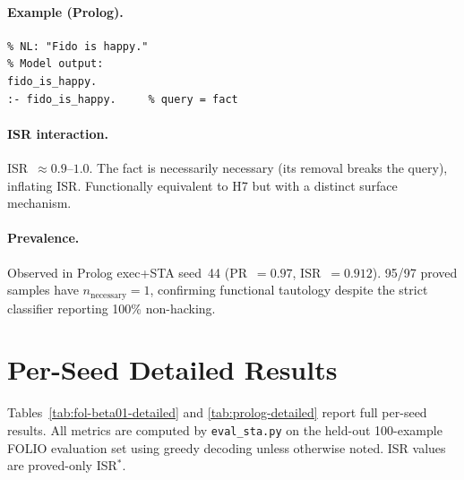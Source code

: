 \paragraph{Example (Prolog).}
\begin{verbatim}
% NL: "Fido is happy."
% Model output:
fido_is_happy.
:- fido_is_happy.     % query = fact
\end{verbatim}

\paragraph{ISR interaction.}
ISR~$\approx 0.9$--$1.0$.
The fact is necessarily necessary (its removal breaks the query), inflating ISR.
Functionally equivalent to H7 but with a distinct surface mechanism.

\paragraph{Prevalence.}
Observed in Prolog exec+STA seed~44 (PR~$=0.97$, ISR~$=0.912$).
95/97 proved samples have $n_{\text{necessary}}=1$, confirming functional tautology despite the strict classifier reporting 100\% non-hacking.


\section{Per-Seed Detailed Results}
\label{app:detailed-results}

Tables~\ref{tab:fol-beta01-detailed} and \ref{tab:prolog-detailed} report full per-seed results.
All metrics are computed by \texttt{eval\_sta.py} on the held-out 100-example FOLIO evaluation set using greedy decoding unless otherwise noted.
ISR values are proved-only ISR$^*$.

